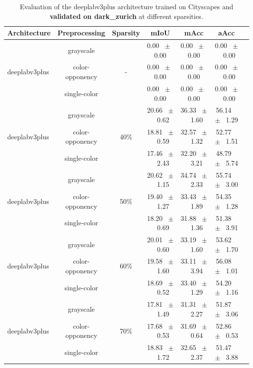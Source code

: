 \begin{table}[h]
  \centering
  \caption{Evaluation of the deeplabv3plus architecture trained on Cityscapes and \textbf{validated on dark_zurich} at different sparsities.}
  \begin{tabular}{@{}lccc ccc@{}}
    \toprule
    Architecture & Preprocessing & Sparsity & mIoU & mAcc & aAcc \\
    \midrule
    \midrule
    \midrule
    \multirow{3}{*}{deeplabv3plus} & grayscale & \multirow{3}{*}{-} & 0.00 ~$\pm$~ 0.00 & 0.00 ~$\pm$~ 0.00 & 0.00 ~$\pm$~ 0.00 \\
    & color-opponency & & 0.00 ~$\pm$~ 0.00 & 0.00 ~$\pm$~ 0.00 & 0.00 ~$\pm$~ 0.00 \\
    & single-color & & 0.00 ~$\pm$~ 0.00 & 0.00 ~$\pm$~ 0.00 & 0.00 ~$\pm$~ 0.00 \\
    \midrule
    \multirow{3}{*}{deeplabv3plus} & grayscale & \multirow{3}{*}{40\%} & 20.66 ~$\pm$~ 0.62 & 36.33 ~$\pm$~ 1.60 & 56.14 ~$\pm$~ 1.29 \\
    & color-opponency & & 18.81 ~$\pm$~ 0.59 & 32.57 ~$\pm$~ 1.32 & 52.77 ~$\pm$~ 1.51 \\
    & single-color & & 17.46 ~$\pm$~ 2.43 & 32.20 ~$\pm$~ 3.21 & 48.79 ~$\pm$~ 5.74 \\
    \midrule
    \multirow{3}{*}{deeplabv3plus} & grayscale & \multirow{3}{*}{50\%} & 20.62 ~$\pm$~ 1.15 & 34.74 ~$\pm$~ 2.33 & 55.74 ~$\pm$~ 3.00 \\
    & color-opponency & & 19.40 ~$\pm$~ 1.27 & 33.43 ~$\pm$~ 1.89 & 54.35 ~$\pm$~ 1.28 \\
    & single-color & & 18.20 ~$\pm$~ 0.69 & 31.88 ~$\pm$~ 1.36 & 51.38 ~$\pm$~ 3.91 \\
    \midrule
    \multirow{3}{*}{deeplabv3plus} & grayscale & \multirow{3}{*}{60\%} & 20.01 ~$\pm$~ 0.60 & 33.19 ~$\pm$~ 1.60 & 53.62 ~$\pm$~ 1.70 \\
    & color-opponency & & 19.58 ~$\pm$~ 1.60 & 33.11 ~$\pm$~ 3.94 & 56.08 ~$\pm$~ 1.01 \\
    & single-color & & 18.69 ~$\pm$~ 0.52 & 33.40 ~$\pm$~ 1.29 & 54.20 ~$\pm$~ 1.16 \\
    \midrule
    \multirow{3}{*}{deeplabv3plus} & grayscale & \multirow{3}{*}{70\%} & 17.81 ~$\pm$~ 1.49 & 31.31 ~$\pm$~ 2.27 & 51.87 ~$\pm$~ 3.06 \\
    & color-opponency & & 17.68 ~$\pm$~ 0.53 & 31.69 ~$\pm$~ 0.64 & 52.86 ~$\pm$~ 0.53 \\
    & single-color & & 18.83 ~$\pm$~ 1.72 & 32.65 ~$\pm$~ 2.37 & 51.47 ~$\pm$~ 3.88 \\

\end{tabular}
\end{table}
